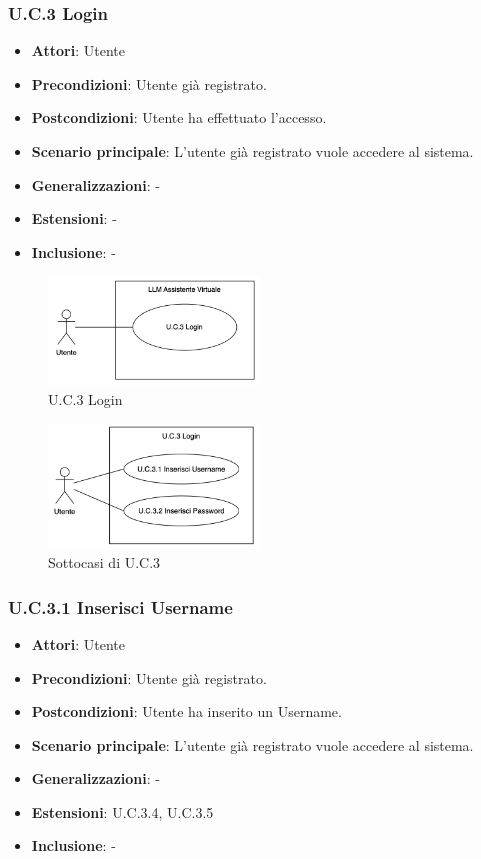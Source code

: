 \subsubsection{U.C.3 Login}
\begin{itemize}
    \item \textbf{Attori}: Utente
    \item \textbf{Precondizioni}: Utente già registrato.
    \item \textbf{Postcondizioni}: Utente ha effettuato l'accesso.
    \item \textbf{Scenario principale}: L'utente già registrato vuole accedere al sistema.
    \item \textbf{Generalizzazioni}: -
    \item \textbf{Estensioni}: -
    \item \textbf{Inclusione}: -
\end{itemize}
\begin{figure}[H]
    \centering
    \includegraphics[width=0.5\textwidth]{img/UC3.png}
    \caption{U.C.3 Login}
\end{figure}
\begin{figure}[H]
    \centering
    \includegraphics[width=0.5\textwidth]{img/UC3p1.png}
    \caption{Sottocasi di U.C.3}
\end{figure}
\subsubsection{U.C.3.1 Inserisci Username}
\begin{itemize}
    \item \textbf{Attori}: Utente
    \item \textbf{Precondizioni}: Utente già registrato.
    \item \textbf{Postcondizioni}: Utente ha inserito un Username.
    \item \textbf{Scenario principale}: L'utente già registrato vuole accedere al sistema.
    \item \textbf{Generalizzazioni}: -
    \item \textbf{Estensioni}: U.C.3.4, U.C.3.5
    \item \textbf{Inclusione}: -
\end{itemize}
